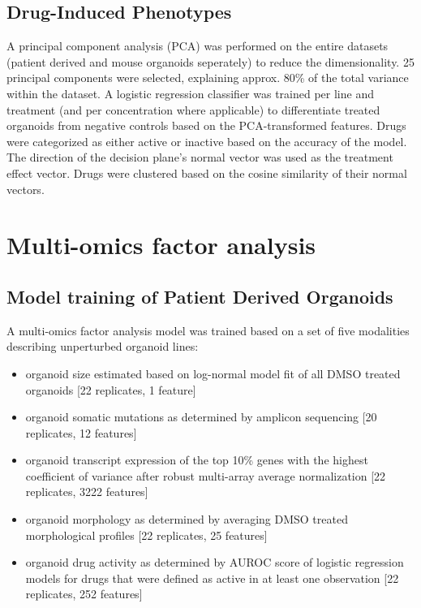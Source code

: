 \begin{flushleft}
\subsection{Drug-Induced Phenotypes}
A principal component analysis (PCA) was performed on the entire datasets (patient derived and mouse organoids seperately) to reduce the dimensionality. 25 principal components were selected, explaining approx. 80\% of the total variance within the dataset. A logistic regression classifier was trained per line and treatment (and per concentration where applicable) to differentiate treated organoids from negative controls based on the PCA-transformed features. Drugs were categorized as either active or inactive based on the accuracy of the model. The direction of the decision plane's normal vector was used as the treatment effect vector. Drugs were clustered based on the cosine similarity of their normal vectors.


\section{Multi-omics factor analysis}
\subsection{Model training of Patient Derived Organoids}
A multi-omics factor analysis model \parencite{argelaguetMultiOmicsFactorAnalysis2018b} was trained based on a set of five modalities describing unperturbed organoid lines:

\begin{itemize}
    \item organoid size estimated based on log-normal model fit of all DMSO treated organoids [22 replicates, 1 feature]
    \item organoid somatic mutations as determined by amplicon sequencing [20 replicates, 12 features]
    \item organoid transcript expression of the top 10\% genes with the highest coefficient of variance after robust multi-array average normalization [22 replicates, 3222 features]
    \item organoid morphology as determined by averaging DMSO treated morphological profiles [22 replicates, 25 features]
    \item organoid drug activity as determined by AUROC score of logistic regression models for drugs that were defined as active in at least one observation [22 replicates, 252 features]
\end{itemize}



\end{flushleft}
